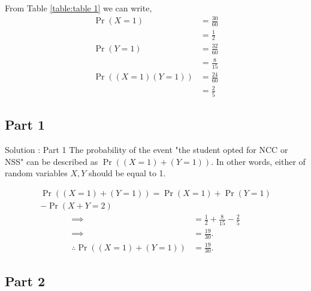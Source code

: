\documentclass{beamer}
\providecommand{\pr}[1]{\ensuremath{\Pr\left(#1\right)}}
\providecommand{\brak}[1]{\ensuremath{\left(#1\right)}}
\begin{document}
        From Table \ref{table:table 1} we can write,
          \begin{align}
               \pr{X = 1} &= \frac{30}{60} \\
                               &=\frac{1}{2}\\
               \pr{Y = 1} &= \frac{32}{60} \\
                               &= \frac{8}{15}\label{eq:4}\\
               \pr{\brak{X = 1}\brak{Y=1}} &= \frac{24}{60}\\
                                                         &= \frac{2}{5}\label{eq:6}
          \end{align}
 \subsection{Part 1}
     
\begin{frame}{Solution : Part 1}
      The probability of the event "the student opted for NCC or NSS" can be described as $\pr{\brak{X = 1} + \brak{Y = 1}}$. In other words, either of random variables 
                $X,Y$ should be equal to 1.
                  
                   \begin{equation}
                   \begin{split}
                      \pr{\brak{X = 1} + \brak{Y = 1}} = \pr{X=1}+\pr{Y=1}\\
                                                                                    -\pr{X+Y=2}
                    \end{split}
                   \end{equation}
                  \begin{align}
                        \implies      &= \frac{1}{2} + \frac{8}{15}  - \frac{2}{5}\\
                        \implies      &= \frac{19}{30}.\\
                    \therefore \pr{\brak{X = 1} + \brak{Y = 1}} &= \frac{19}{30}.\label{eq:10}
                    \end{align}
\end{frame} 
\subsection{Part 2}
\end{document}
